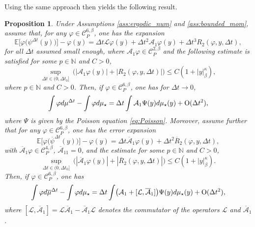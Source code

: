 \documentclass[11pt]{amsart}
\newcommand{\E}{\mathbb{E}}
\newcommand{\N}{\mathbb{N}}
\newtheorem{propo}[theo]{Proposition}
\begin{document}
Using the same approach then yields the following result.
\begin{propo}\label{propo:order2}
Under Assumptions \ref{ass:ergodic_num} and \ref{ass:bounded_mom}, assume that, for any $\varphi\in\mathcal{C}^{6,\beta}_P$, one has the expansion
\[
\E\bigl[\varphi\bigl(\psi^{\Delta t}(y)\bigr)\bigr]-\varphi(y)=\Delta t\mathcal{L}\varphi(y) +\Delta t^2\mathcal{A}_1\varphi(y)+\Delta t^3R_2(\varphi,y,\Delta t),
\]
for all $\Delta t$ assumed small enough,
where $\mathcal{A}_1\varphi\in\mathcal{C}^{2,\beta}_P$ and the following estimate is satisfied for some $p\in\N$ and $C>0$,
\[\underset{\Delta t\in(0,\Delta t_0]}\sup~\bigl(|\mathcal{A}_1\varphi(y)|+|R_2(\varphi,y,\Delta t)|\bigr)\le C(1+|y|_\beta^\kappa),\]
where $p\in\N$ and $C>0$.
%
Then, if $\varphi\in\mathcal{C}^{6,\beta}_P$, one has for $\Delta t \rightarrow 0$,
\begin{equation}\label{eq:expansion_order2}
\int\varphi d\mu^{\Delta t}-\int\varphi d\mu_\star=\Delta t\int \mathcal{A}_1\Psi(y)d\mu_\star(y)+{\rm O}(\Delta t^2),
\end{equation}
where $\Psi$ is given by the Poisson equation \eqref{eq:Poisson}.
%
Moreover, assume further that for any $\varphi\in\mathcal{C}^{6,\beta}_P$, one has the error expansion
\[
\E\bigl[\varphi\bigl(\overline{\psi}^{\Delta t}(y)\bigr)\bigr]-\varphi(y)=\Delta t\overline{\mathcal{A}}_1\varphi(y)+\Delta t^2\overline{R}_2(\varphi,y,\Delta t),
\]
with $\overline{\mathcal{A}}_1\varphi\in\mathcal{C}^{4,\beta}_P$, $\overline{\mathcal{A}}_11=0$, and the estimate for some $p\in\N$ and $C>0$,
\[\underset{\Delta t\in(0,\Delta t_0]}\sup~\bigl(|\overline{\mathcal{A}}_1\varphi(y)|+|\overline{R}_2(\varphi,y,\Delta t)|\bigr)\le C(1+|y|_\beta^\kappa).\]
%
Then, if $\varphi\in\mathcal{C}^{6,\beta}_P$, one has
\begin{equation}\label{eq:expansion_order2-postproc}
\int\varphi d\overline{\mu}^{\Delta t}-\int\varphi d\mu_\star=\Delta t\int \bigl(\mathcal{A}_1+[\mathcal{L},\overline{\mathcal{A}}_1]\bigr)\Psi(y)d\mu_\star(y)+{\rm O}(\Delta t^2),
\end{equation}
where $[\mathcal{L},\overline{\mathcal{A}}_1]=\mathcal{L}\overline{\mathcal{A}}_1-\overline{\mathcal{A}}_1\mathcal{L}$ denotes the commutator of the operators $\mathcal{L}$ and $\overline{\mathcal{A}}_1$. 
\end{propo}
\end{document}
